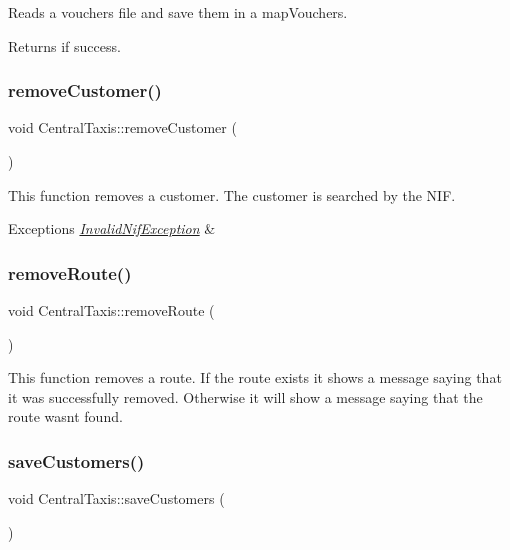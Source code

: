 Reads a vouchers file and save them in a map\+Vouchers. \begin{DoxyReturn}{Returns}
if success. 
\end{DoxyReturn}
\hypertarget{classCentralTaxis_af3f66bbaf6634e194516cad57e81dc29}{}\label{classCentralTaxis_af3f66bbaf6634e194516cad57e81dc29} 
\subsubsection{\texorpdfstring{remove\+Customer()}{removeCustomer()}}
{\footnotesize\ttfamily void Central\+Taxis\+::remove\+Customer (\begin{DoxyParamCaption}{ }\end{DoxyParamCaption})}

This function removes a customer. The customer is searched by the N\+IF. 
\begin{DoxyExceptions}{Exceptions}
{\em \hyperlink{classInvalidNifException}{Invalid\+Nif\+Exception}} & \\
\hline
\end{DoxyExceptions}
\hypertarget{classCentralTaxis_a41834471902f8edecd3bca59aded0a17}{}\label{classCentralTaxis_a41834471902f8edecd3bca59aded0a17} 
\subsubsection{\texorpdfstring{remove\+Route()}{removeRoute()}}
{\footnotesize\ttfamily void Central\+Taxis\+::remove\+Route (\begin{DoxyParamCaption}{ }\end{DoxyParamCaption})}

This function removes a route. If the route exists it shows a message saying that it was successfully removed. Otherwise it will show a message saying that the route wasn\textquotesingle{}t found. \hypertarget{classCentralTaxis_a25e5982f718aed970a3e45a52ed5f679}{}\label{classCentralTaxis_a25e5982f718aed970a3e45a52ed5f679} 
\subsubsection{\texorpdfstring{save\+Customers()}{saveCustomers()}}
{\footnotesize\ttfamily void Central\+Taxis\+::save\+Customers (\begin{DoxyParamCaption}{ }\end{DoxyParamCaption})}

